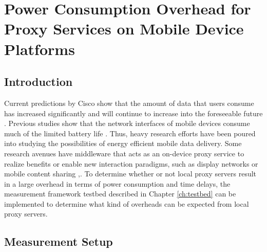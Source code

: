 \chapter{Power Consumption Overhead for Proxy Services on Mobile Device Platforms}
\section*{Introduction}
Current predictions by Cisco show that the amount of data that users consume has increased significantly and will continue to increase into the foreseeable future \cite{VNI14}. Previous studies show that the network interfaces of mobile devices consume much of the limited battery life \cite{Carroll:2010:APC:1855840.1855861}. Thus, heavy research efforts have been poured into studying the possibilities of energy efficient mobile data delivery. Some research avenues have middleware that acts as an on-device proxy service to realize benefits or enable new interaction paradigms, such as display networks \cite{6174992} or mobile content sharing \cite{Seeling:2014:OES:2671189.2671194},\cite{6692468}. To determine whether or not local proxy servers result in a large overhead in terms of power consumption and time delays, the measurement framework testbed described in Chapter \ref{ch:testbed} can be implemented to determine what kind of overheads can be expected from local proxy servers.

\section*{Measurement Setup} 